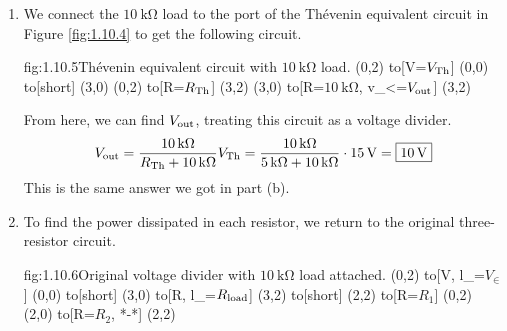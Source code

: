 \begin{enumerate}
    To find the Th\'evinen resistance, we need to find the short circuit current, $I_{SC}$. We short circuit the port and measure the current flowing through it.
    \begin{circuit}{fig:1.10.3}{Voltage divider with short circuit on the output.}
        (0,2) to[V=$V_\in$] (0,0) 
        to[short] (2,0)
        to[R=$R_2$] (2,2)
        to[R=$R_1$](0,2)
        (2,0) to[short] (3,0)
        (2,2) to[short] (3,2)
        (3,0) to[short, i_<=$I_{SC}$] (3,2) 
    \end{circuit}
    
    In this circuit, no current flows through $R_2$, flowing through the short instead. Thus we have $I_{SC} = \dfrac{V_\in }{R_1}$. From this, we can find $R_\Th$ from $R_\Th = \dfrac{V_\Th}{I_{SC}}$. This gives us 
    \[R_\Th = \frac{V_\Th}{I_{SC}} = \frac{V_\Th}{V_\in/R_1} = \frac{\SI{15}{\V}}{\SI{30}{\V}/\SI{10}{\kohm}} = \mans{\SI{5}{\kohm}}\]

    The Th\'evenin equivalent circuit takes the form shown below.
    \begin{circuit}{fig:1.10.4}{Th\'evenin equivalent circuit.}
        (0,2) to[V=$V_\Th$] (0,0)
        to[short, -o] (3,0)
        (0,2) to[R=$R_\Th$, -o] (3,2)
        (3,0) to[open, v_<=$V_\out$] (3,2)
    \end{circuit}
    In terms of behavior at the ports, this circuit is equivalent to the circuit in Figure \ref{fig:1.10.1}. 

    \item 
    We connect the $\SI{10}{\kohm}$ load to the port of the Th\'evenin equivalent circuit in Figure \ref{fig:1.10.4} to get the following circuit.
    \begin{circuit}{fig:1.10.5}{Th\'evenin equivalent circuit with $\SI{10}{\kohm}$ load.}
        (0,2) to[V=$V_{\text{Th}}$] (0,0)
        to[short] (3,0)
        (0,2) to[R=$R_{\text{Th}}$] (3,2)
        (3,0) to[R=$\SI{10}{\kohm}$, v_<=$V_\out$] (3,2)
    \end{circuit}
    From here, we can find $V_\out$, treating this circuit as a voltage divider.
    \[V_\out = \frac{\SI{10}{\kohm}}{R_\Th + \SI{10}{\kohm}} V_\Th = \frac{\SI{10}{\kohm}}{\SI{5}{\kohm} + \SI{10}{\kohm}} \cdot \SI{15}{\V} = \mans{\SI{10}{\V}}\] 
    This is the same answer we got in part (b).

    \item 
    To find the power dissipated in each resistor, we return to the original three-resistor circuit. 
    \begin{circuit}{fig:1.10.6}{Original voltage divider with $\SI{10}{\kohm}$ load attached.}
        (0,2) to[V, l_=$V_\in$] (0,0)
            to[short] (3,0)
            to[R, l_=$R_{\text{load}}$] (3,2)
            to[short] (2,2)
            to[R=$R_1$] (0,2)
        (2,0) to[R=$R_2$, *-*] (2,2)
    \end{circuit}


\end{enumerate}
